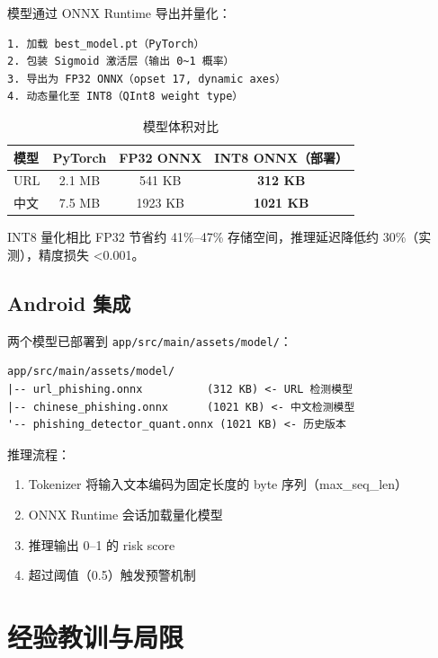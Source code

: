 \documentclass[11pt,a4paper]{article}
\begin{document}
模型通过 ONNX Runtime 导出并量化：

\begin{Verbatim}[frame=single,fontsize=\small,label=ONNX 导出流程]
1. 加载 best_model.pt（PyTorch）
2. 包装 Sigmoid 激活层（输出 0~1 概率）
3. 导出为 FP32 ONNX（opset 17, dynamic axes）
4. 动态量化至 INT8（QInt8 weight type）
\end{Verbatim}

\begin{table}[h]
\centering
\caption{模型体积对比}
\begin{tabular}{lccc}
\toprule
模型 & PyTorch & FP32 ONNX & INT8 ONNX（部署） \\
\midrule
URL & 2.1 MB & 541 KB & \textbf{312 KB} \\
中文 & 7.5 MB & 1923 KB & \textbf{1021 KB} \\
\bottomrule
\end{tabular}
\end{table}

INT8 量化相比 FP32 节省约 41\%--47\% 存储空间，推理延迟降低约 30\%（实测），精度损失 \textless 0.001。

\subsection{Android 集成}

两个模型已部署到 \texttt{app/src/main/assets/model/}：

\begin{Verbatim}[frame=single,fontsize=\small]
app/src/main/assets/model/
|-- url_phishing.onnx          (312 KB) <- URL 检测模型
|-- chinese_phishing.onnx      (1021 KB) <- 中文检测模型
'-- phishing_detector_quant.onnx (1021 KB) <- 历史版本
\end{Verbatim}

推理流程：
\begin{enumerate}
  \item Tokenizer 将输入文本编码为固定长度的 byte 序列（max\_seq\_len）
  \item ONNX Runtime 会话加载量化模型
  \item 推理输出 0--1 的 risk score
  \item 超过阈值（0.5）触发预警机制
\end{enumerate}

\section{经验教训与局限}
\end{document}
